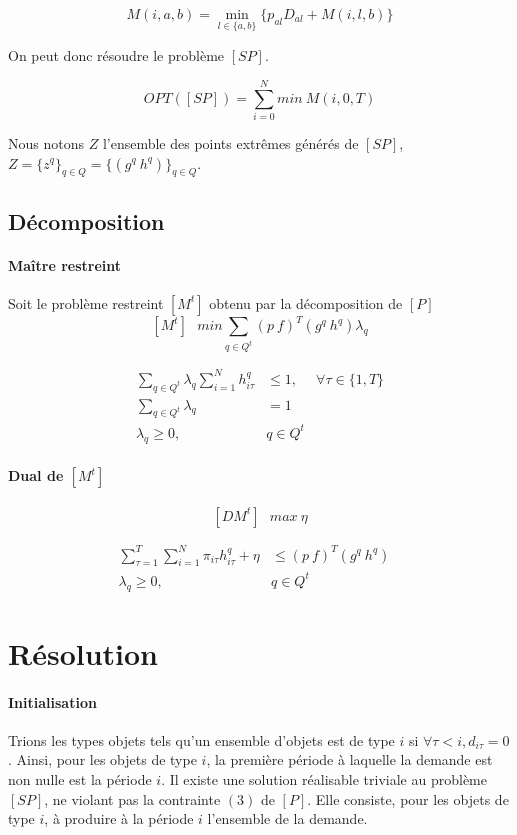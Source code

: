 \documentclass[12pt,a4paper]{article}
\begin{document}
	 $$ M(i,a,b) =  \min_{l \in \{a,b\}} \{ p_{al}D_{al} + M(i,l,b) \} $$
	 
	 On peut donc résoudre le problème $[SP]$.
	 
	 $$ OPT([SP]) = \sum_{i=0}^N min~M(i,0,T) $$
	
	Nous notons $Z$ l'ensemble des points extrêmes générés de $[SP]$, $Z=\{z^q\}_{q\in Q} = \{ (g^q~h^q) \}_{q\in Q}$.
	
\subsection*{Décomposition}
\paragraph{Maître restreint} Soit le problème restreint $[M^t]$ obtenu par la décomposition de $[P]$
 	$$ [M^t] ~~~ min \sum_{q \in Q^t} (p~f)^T(g^q~h^q)\lambda_q $$	
 	
	\begin{eqnarray}	
 		\sum_{q \in Q^t} \lambda_q \sum_{i=1}^N h_{i\tau}^q &\leq 1, & \forall \tau \in \{1,T\} \\
 		\sum_{q \in Q^t} \lambda_q &=1 & \\
 		\lambda_q \geq 0,& q \in Q^t & \nonumber
 	\end{eqnarray}
 	
\newpage 
\paragraph{Dual de $[M^t]$} 

$$ [DM^t] ~~~ max ~ \eta $$	

\begin{eqnarray}	
 		\sum_{\tau=1}^T \sum_{i=1}^N \pi_{i\tau}h_{i\tau}^q + \eta &\leq (p~f)^T(g^q~h^q) \\
 		\lambda_q \geq 0,& q \in Q^t & \nonumber
 \end{eqnarray}
 	

\section*{Résolution}	

\paragraph{Initialisation} Trions les types objets tels qu'un ensemble d'objets est de type $i$ si $\forall \tau < i , d_{i\tau} = 0$. Ainsi, pour les objets de type $i$, la première période à laquelle la demande est non nulle est la période $i$. \medbreak
 Il existe une solution réalisable triviale au problème $[SP]$, ne violant pas la contrainte $(3)$ de $[P]$. Elle consiste, pour les objets de type $i$, à produire à la période $i$ l'ensemble de la demande.
 
\end{document}
